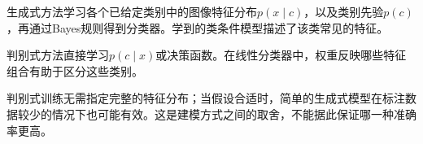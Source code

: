 生成式方法学习各个已给定类别中的图像特征分布\(p(x\mid c)\)，以及类别先验\(p(c)\)，再通过Bayes规则得到分类器。学到的类条件模型描述了该类常见的特征。


判别式方法直接学习\(p(c\mid x)\)或决策函数。在线性分类器中，权重反映哪些特征组合有助于区分这些类别。


判别式训练无需指定完整的特征分布；当假设合适时，简单的生成式模型在标注数据较少的情况下也可能有效。这是建模方式之间的取舍，不能据此保证哪一种准确率更高。
